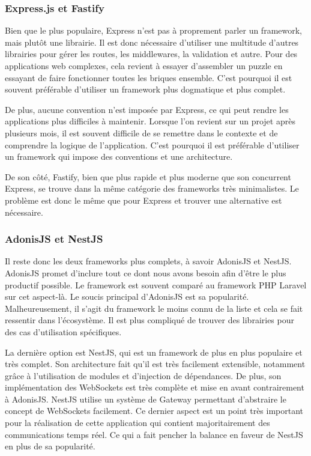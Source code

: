 \subsubsection{Express.js et Fastify}

Bien que le plus populaire, Express n'est pas à proprement parler un framework, mais plutôt une librairie. Il est donc nécessaire d'utiliser une multitude d'autres librairies pour gérer les routes, les middlewares, la validation et autre. Pour des applications web complexes, cela revient à essayer d'assembler un puzzle en essayant de faire fonctionner toutes les briques ensemble. C'est pourquoi il est souvent préférable d'utiliser un framework plus dogmatique et plus complet.

De plus, aucune convention n'est imposée par Express, ce qui peut rendre les applications plus difficiles à maintenir. Lorsque l'on revient sur un projet après plusieurs mois, il est souvent difficile de se remettre dans le contexte et de comprendre la logique de l'application. C'est pourquoi il est préférable d'utiliser un framework qui impose des conventions et une architecture.

De son côté, Fastify, bien que plus rapide et plus moderne que son concurrent Express, se trouve dans la même catégorie des frameworks très minimalistes. Le problème est donc le même que pour Express et trouver une alternative est nécessaire.

\subsubsection{AdonisJS et NestJS}

Il reste donc les deux frameworks plus complets, à savoir AdonisJS et NestJS. AdonisJS promet d'inclure tout ce dont nous avons besoin afin d'être le plus productif possible. Le framework est souvent comparé au framework PHP Laravel \cite{laravel} sur cet aspect-là. Le soucis principal d'AdonisJS est sa popularité. Malheureusement, il s'agit du framework le moins connu de la liste et cela se fait ressentir dans l'écosystème. Il est plus compliqué de trouver des librairies pour des cas d'utilisation spécifiques.

La dernière option est NestJS, qui est un framework de plus en plus populaire et très complet. Son architecture fait qu'il est très facilement extensible, notamment grâce à l'utilisation de modules et d'injection de dépendances. De plus, son implémentation des WebSockets est très complète et mise en avant contrairement à AdonisJS. NestJS utilise un système de Gateway \cite{nestjs-gateway} permettant d'abstraire le concept de WebSockets facilement.  Ce dernier aspect est un point très important pour la réalisation de cette application qui contient majoritairement des communications temps réel. Ce qui a fait pencher la balance en faveur de NestJS en plus de sa popularité.

